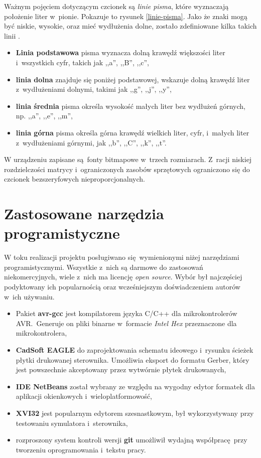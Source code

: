 Ważnym pojęciem dotyczącym czcionek są \textit{linie pisma}, które wyznaczają położenie liter w~pionie. Pokazuje to rysunek \ref{linie-pisma}. Jako że znaki mogą być niskie, wysokie, oraz mieć wydłużenia dolne, zostało zdefiniowane kilka takich linii \cite{fonts}.
\begin{itemize}
	\item \textbf{Linia podstawowa} pisma wyznacza dolną krawędź większości liter i~wszystkich cyfr, takich jak ,,a'', ,,B'', ,,c'',
	\item \textbf{linia dolna} znajduje się poniżej podstawowej, wskazuje dolną krawędź liter z~wydłużeniami dolnymi, takimi jak ,,g'', ,,j'', ,,y'',
	\item \textbf{linia średnia} pisma określa wysokość małych liter bez wydłużeń górnych, np. ,,a'', ,,e'', ,,m'',
	\item \textbf{linia górna} pisma określa górna krawędź wielkich liter, cyfr, i~małych liter z~wydłużeniami górnymi, jak ,,b'', ,,C'', ,,k'', ,,t''.
\end{itemize}

W urządzeniu zapisane są fonty bitmapowe w~trzech rozmiarach. Z~racji niskiej rozdzielczości matrycy i~ograniczonych zasobów sprzętowych ograniczono się do czcionek bezszeryfowych nieproporcjonalnych.

\section{Zastosowane narzędzia programistyczne}

W toku realizacji projektu posługiwano się wymienionymi niżej narzędziami programistycznymi. Wszystkie z~nich są darmowe do zastosowań niekomercyjnych, wiele z~nich ma licencję \textit{open source}. Wybór był najczęściej podyktowany ich popularnością oraz wcześniejszym doświadczeniem autorów w~ich używaniu.

\begin{itemize}
	\item Pakiet \textbf{avr-gcc} jest kompilatorem języka C/C++ dla mikrokontrolerów AVR.~Generuje on pliki binarne w~formacie \textit{Intel Hex} przeznaczone dla mikrokontrolera,
	\item \textbf{CadSoft EAGLE} do zaprojektowania schematu ideowego i~rysunku ścieżek płytki drukowanej sterownika. Umożliwia eksport do formatu Gerber, który jest powszechnie akceptowany przez wytwórnie płytek drukowanych,
	\item \textbf{IDE NetBeans} został wybrany ze względu na wygodny edytor formatek dla aplikacji okienkowych i~wieloplatformowość,
	\item \textbf{XVI32} jest popularnym edytorem szesnastkowym, był wykorzystywany przy testowaniu symulatora i~sterownika,
	\item rozproszony system kontroli wersji \textbf{git} umożliwił wydajną współpracę przy tworzeniu oprogramowania i~tekstu pracy.
\end{itemize}

